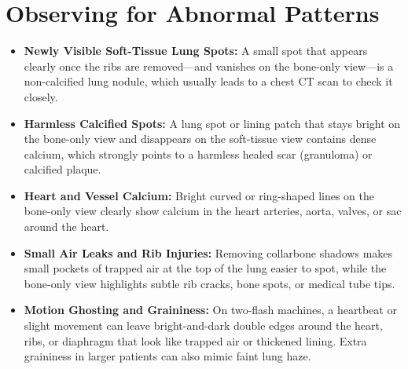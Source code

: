 \section{Observing for Abnormal Patterns}
\begin{itemize}
    \item \textbf{Newly Visible Soft-Tissue Lung Spots:} A small spot that appears clearly once the ribs are removed---and vanishes on the bone-only view---is a non-calcified lung nodule, which usually leads to a chest CT scan to check it closely.
    \item \textbf{Harmless Calcified Spots:} A lung spot or lining patch that stays bright on the bone-only view and disappears on the soft-tissue view contains dense calcium, which strongly points to a harmless healed scar (granuloma) or calcified plaque.
    \item \textbf{Heart and Vessel Calcium:} Bright curved or ring-shaped lines on the bone-only view clearly show calcium in the heart arteries, aorta, valves, or sac around the heart.
    \item \textbf{Small Air Leaks and Rib Injuries:} Removing collarbone shadows makes small pockets of trapped air at the top of the lung easier to spot, while the bone-only view highlights subtle rib cracks, bone spots, or medical tube tips.
    \item \textbf{Motion Ghosting and Graininess:} On two-flash machines, a heartbeat or slight movement can leave bright-and-dark double edges around the heart, ribs, or diaphragm that look like trapped air or thickened lining. Extra graininess in larger patients can also mimic faint lung haze.
\end{itemize}

